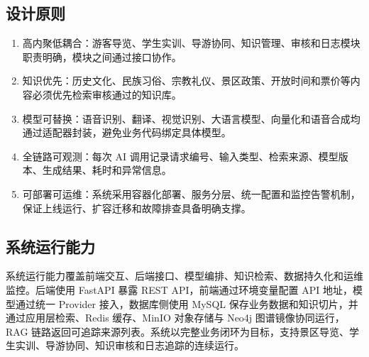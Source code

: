 \subsection{设计原则}

\begin{enumerate}
  \item 高内聚低耦合：游客导览、学生实训、导游协同、知识管理、审核和日志模块职责明确，模块之间通过接口协作。
  \item 知识优先：历史文化、民族习俗、宗教礼仪、景区政策、开放时间和票价等内容必须优先检索审核通过的知识库。
  \item 模型可替换：语音识别、翻译、视觉识别、大语言模型、向量化和语音合成均通过适配器封装，避免业务代码绑定具体模型。
  \item 全链路可观测：每次 AI 调用记录请求编号、输入类型、检索来源、模型版本、生成结果、耗时和异常信息。
  \item 可部署可运维：系统采用容器化部署、服务分层、统一配置和监控告警机制，保证上线运行、扩容迁移和故障排查具备明确支撑。
\end{enumerate}

\subsection{系统运行能力}

系统运行能力覆盖前端交互、后端接口、模型编排、知识检索、数据持久化和运维监控。后端使用 FastAPI 暴露 REST API，前端通过环境变量配置 API 地址，模型通过统一 Provider 接入，数据库侧使用 MySQL 保存业务数据和知识切片，并通过应用层检索、Redis 缓存、MinIO 对象存储与 Neo4j 图谱镜像协同运行，RAG 链路返回可追踪来源列表。系统以完整业务闭环为目标，支持景区导览、学生实训、导游协同、知识审核和日志追踪的连续运行。

